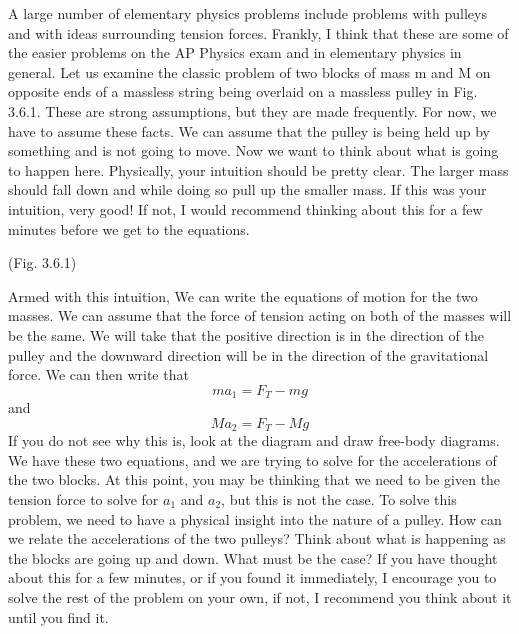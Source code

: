 A large number of elementary physics problems include problems with pulleys and with ideas surrounding tension forces. Frankly, I think that these are some of the easier problems on the AP Physics exam and in elementary physics in general. Let us examine the classic problem of two blocks of mass m and M on opposite ends of a massless string being overlaid on a massless pulley in Fig. 3.6.1. These are strong assumptions, but they are made frequently. For now, we have to assume these facts. We can assume that the pulley is being held up by something and is not going to move. Now we want to think about what is going to happen here. Physically, your intuition should be pretty clear. The larger mass should fall down and while doing so pull up the smaller mass. If this was your intuition, very good! If not, I would recommend thinking about this for a few minutes before we get to the equations. 
\newline
\newline
{}
\begin{center} 
(Fig. 3.6.1)
\end{center}
Armed with this intuition, We can write the equations of motion for the two masses. We can assume that the force of tension acting on both of the masses will be the same. We will take that the positive direction is in the direction of the pulley and the downward direction will be in the direction of the gravitational force. We can then write that \begin{equation}ma_1 = F_{T}-mg\end{equation} and \begin{equation}Ma_2 = F_T-Mg\end{equation} If you do not see why this is, look at the diagram and draw free-body diagrams. We have these two equations, and we are trying to solve for the accelerations of the two blocks. At this point, you may be thinking that we need to be given the tension force to solve for $a_1$ and $a_2$, but this is not the case. To solve this problem, we need to have a physical insight into the nature of a pulley. How can we relate the accelerations of the two pulleys? Think about what is happening as the blocks are going up and down. What must be the case? If you have thought about this for a few minutes, or if you found it immediately, I encourage you to solve the rest of the problem on your own, if not, I recommend you think about it until you find it. 


